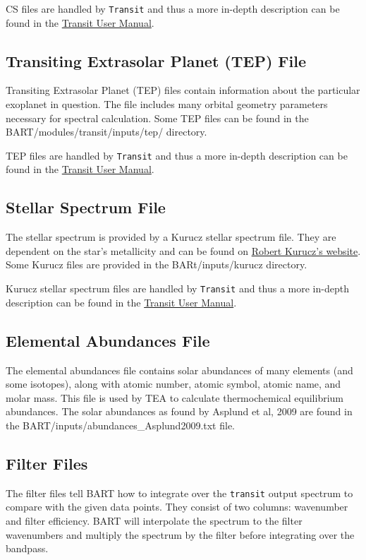 \documentclass[letterpaper, 12pt]{article}
\begin{document}
CS files are handled by {\tt Transit} and thus a more in-depth description can be found in the \href{https://exosports.github.io/transit/doc/Transit_User_Manual.html}{Transit User Manual}.

\subsection{Transiting Extrasolar Planet (TEP) File}
\label{sec:TEP}
Transiting Extrasolar Planet (TEP) files contain information about the particular exoplanet in question. The file includes many orbital geometry parameters necessary for spectral calculation. Some TEP files can be found in the BART/modules/transit/inputs/tep/ directory.

TEP files are handled by {\tt Transit} and thus a more in-depth description can be found in the \href{https://exosports.github.io/transit/doc/Transit_User_Manual.html}{Transit User Manual}.

\subsection{Stellar Spectrum File}
\label{sec:stellarSpec}
The stellar spectrum is provided by a Kurucz stellar spectrum file. They are dependent on the star's metallicity and can be found on \href{http://kurucz.harvard.edu/grids.html}{Robert Kurucz's website}. Some Kurucz files are provided in the BARt/inputs/kurucz directory.

Kurucz stellar spectrum files are handled by {\tt Transit} and thus a more in-depth description can be found in the \href{https://exosports.github.io/transit/doc/Transit_User_Manual.html}{Transit User Manual}.

\subsection{Elemental Abundances File}
\label{sec:elemAbund}
The elemental abundances file contains solar abundances of many elements (and some isotopes), along with atomic number, atomic symbol, atomic name, and molar mass. This file is used by TEA to calculate thermochemical equilibrium abundances. The solar abundances as found by Asplund et al, 2009 are found in the BART/inputs/abundances\_Asplund2009.txt file.

\subsection{Filter Files}
\label{sec:filters}
The filter files tell BART how to integrate over the {\tt transit} output spectrum to compare with the given data points. They consist of two columns: wavenumber and filter efficiency. BART will interpolate the spectrum to the filter wavenumbers and multiply the spectrum by the filter before integrating over the bandpass.
\end{document}

